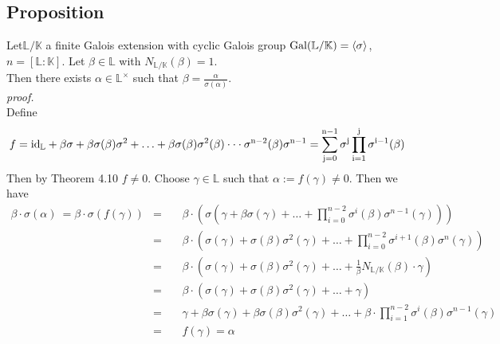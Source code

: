 \documentclass[12pt]{book}
\begin{document}
\begin{spacing}{1.3}
\subsection{Proposition } %
\titleformat{\subsection}{\normalfont\normalsize\bfseries}{}{0em}{#1 \thesubsection}
Let$\mathbb{L}/\mathbb{K}$ a finite Galois extension with cyclic Galois group $\rm{Gal}(\mathbb{L}/\mathbb{K})=\langle \sigma \rangle$, $n=[\mathbb{L}:\mathbb{K}]$. Let $\beta \in \mathbb{L}$ with $N_{\mathbb{L}/\mathbb{K}}(\beta)=1$.\\
Then there exists $\alpha \in \mathbb{L}^{\times}$ such that $\beta= \frac{\alpha}{\sigma(\alpha)}$.\\
\textit{proof.}\\
Define
$$f=\rm{id}_{\mathbb{L}}+\beta  \sigma+ \beta  \sigma(\beta) \sigma^2 + \ldots + \beta  \sigma(\beta)  \sigma^2(\beta) \cdot \cdot \cdot \sigma^{n-2}(\beta) \sigma^{n-1}=\sum_{j=0}^{n-1} \sigma^j  \prod_{i=1}^j \sigma^{i-1}(\beta)$$
Then by Theorem 4.10 $f\neq 0$. Choose $\gamma \in \mathbb{L}$ such that $\alpha:=f(\gamma)\neq 0$. Then we have
\allowdisplaybreaks[1]
\begin{alignat*}{7}
\beta \cdot \sigma(\alpha)\ = \beta \cdot \sigma \left(f(\gamma)\right)&=&&\ \beta \cdot \left(\sigma\left(\gamma+ \beta \sigma(\gamma) + \ldots + \prod_{i=0 }^{n-2} \sigma^{i}(\beta) \sigma^{n-1}(\gamma)\right)\right)\\
&=&& \ \beta \cdot \left(\sigma(\gamma)+\sigma(\beta) \sigma^2(\gamma) + \ldots + \prod_{i=0}^{n-2} \sigma^{i+1}(\beta) \sigma^n(\gamma)\right)\\
&=&& \ \beta \cdot \left(\sigma(\gamma)+\sigma(\beta) \sigma^2(\gamma) + \ldots +  \frac{1}{\beta} N_{\mathbb{L}/\mathbb{K}}(\beta) \cdot \gamma\right)\\
&=&&\ \beta \cdot \left(\sigma(\gamma)+\sigma(\beta) \sigma^2(\gamma) + \ldots + \gamma\right)\\
&=&&\ \gamma+ \beta \sigma(\gamma)+ \beta \sigma(\beta) \sigma^2(\gamma)+ \ldots + \beta \cdot \prod_{i=1}^{n-2} \sigma^{i}(\beta) \sigma^{n-1}(\gamma)\\
&=&&\ f(\gamma)=\alpha
\end{alignat*}


\end{spacing}
\end{document}
